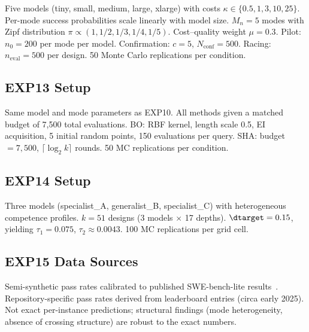 \documentclass[11pt]{article}
\newcommand{\Mn}{M_n}
\begin{document}
Five models (tiny, small, medium, large, xlarge) with costs
$\kappa \in \{0.5, 1, 3, 10, 25\}$.
Per-mode success probabilities scale linearly with model size.
$\Mn{=}5$ modes with Zipf distribution
$\pi \propto (1, 1/2, 1/3, 1/4, 1/5)$.
Cost--quality weight $\mu = 0.3$.
Pilot: $n_0 = 200$ per mode per model.
Confirmation: $c = 5$, $N_{\mathrm{conf}} = 500$.
Racing: $n_{\mathrm{eval}} = 500$ per design.
50 Monte Carlo replications per condition.

\subsection{EXP13 Setup}

Same model and mode parameters as EXP10.
All methods given a matched budget of 7,500 total evaluations.
BO: RBF kernel, length scale 0.5, EI acquisition, 5 initial random
points, 150 evaluations per query.
SHA: budget $= 7{,}500$, $\lceil\log_2 k\rceil$ rounds.
50 MC replications per condition.

\subsection{EXP14 Setup}

Three models (specialist\_A, generalist\_B, specialist\_C) with
heterogeneous competence profiles.
$k = 51$ designs (3 models $\times$ 17 depths).
$\dtarget = 0.15$, yielding $\tau_1 = 0.075$, $\tau_2 \approx 0.0043$.
100 MC replications per grid cell.

\subsection{EXP15 Data Sources}

Semi-synthetic pass rates calibrated to published SWE-bench-lite
results~\citep{jimenez2024swebench}.
Repository-specific pass rates derived from leaderboard entries
(circa early 2025).
Not exact per-instance predictions; structural findings (mode
heterogeneity, absence of crossing structure) are robust to the
exact numbers.
\end{document}
